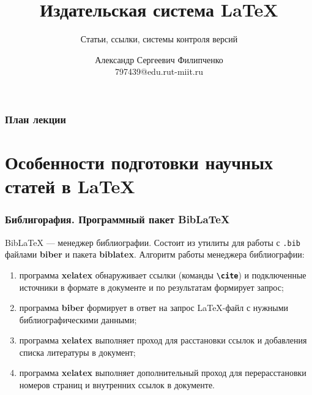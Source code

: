 \documentclass[aspectratio=169]{beamer}
\title[Заголовок]{Издательская система \LaTeX{}}
\subtitle{Статьи, ссылки, системы контроля версий}
\author[Имя автора]{Александр Сергеевич Филипченко \\ \smallskip \scriptsize 797439@edu.rut-miit.ru\\}
\institute{кафедра <<Вычислительные системы, сети и информационная безопасность>>}
\begin{document}

\frame[plain]{\titlepage}	%

\begin{frame}
\frametitle{План лекции}
\tableofcontents
\end{frame}

\section{Особенности подготовки научных статей в \LaTeX{}}

\begin{frame}
\frametitle{Библигорафия. Программный пакет BibLaTeX}
BibLaTeX --- менеджер библиографии.
Состоит из утилиты для работы с \texttt{.bib} файлами \textbf{biber} и пакета \textbf{biblatex}.
Алгоритм работы менеджера библиографии:
\begin{enumerate} 
\item программа \textbf{xelatex} обнаруживает ссылки (команды \texttt{\textbf{\textbackslash cite}}) и подключенные источники в формате в документе и по результатам формирует запрос;
\item программа \textbf{biber} формирует в ответ на запрос LaTeX-файл с нужными библиографическими данными;
\item программа \textbf{xelatex} выполняет проход для расстановки ссылок и добавления списка литературы в документ;
\item программа \textbf{xelatex} выполняет дополнительный проход для перерасстановки номеров страниц и внутренних ссылок в документе.
\end{enumerate} 
\end{frame}
\end{document}
